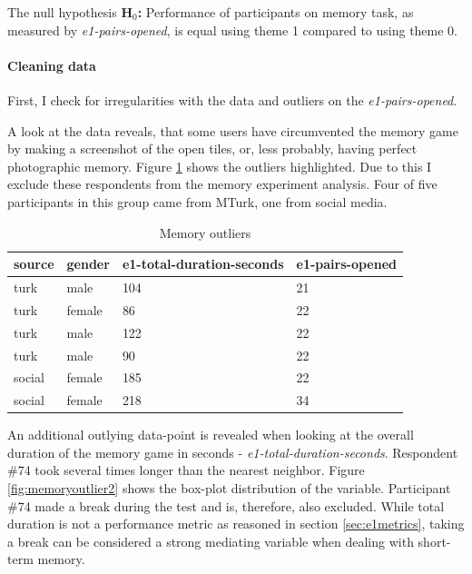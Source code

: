 		The null hypothesis \textbf{H$_{0}$:} Performance of participants on memory task, as measured by \textit{e1-pairs-opened}, is equal using theme 1 compared to using theme 0.
	
		\paragraph{Cleaning data} %
		
		First, I check for irregularities with the data and outliers on the \textit{e1-pairs-opened}.
		
		A look at the data reveals, that some users have circumvented the memory game by making a screenshot of the open tiles, or, less probably, having perfect photographic memory. Figure \ref{tbl:e1-pairs-opened} shows the outliers highlighted. Due to this I exclude these respondents from the memory experiment analysis. Four of five participants in this group came from MTurk, one from social media.
		
		\begin{table}[]
			\begin{center}
				\begin{tabular}{|l|l|l|l|}
					\hline 
					source & gender & e1-total-duration-seconds & e1-pairs-opened \rule[-2ex]{0pt}{6ex} \\ \hline \hline
					turk   & male   & 104                          & \cellcolor[HTML]{FFFFC7}21                \\ \hline
					turk   & female & 86                           & \cellcolor[HTML]{FFFFC7}22                \\ \hline
					turk   & male   & 122                          & \cellcolor[HTML]{FFFFC7}22                \\ \hline
					turk   & male   & 90                           & \cellcolor[HTML]{FFFFC7}22                \\ \hline
					social & female & 185                          & \cellcolor[HTML]{FFFFC7}22                \\ \hline
					social & female & 218                          & 34                \\ \hline
				\end{tabular}
			\end{center}
			\caption{Memory outliers}
			\label{tbl:e1-pairs-opened}
		\end{table}
	
		An additional outlying data-point is revealed when looking at the overall duration of the memory game in seconds - \textit{e1-total-duration-seconds}. Respondent \#74 took several times longer than the nearest neighbor. Figure \ref{fig:memoryoutlier2} shows the box-plot distribution of the variable. Participant \#74 made a break during the test and is, therefore, also excluded. While total duration is not a performance metric as reasoned in section \ref{sec:e1metrics}, taking a break can be considered a strong mediating variable when dealing with short-term memory.
		
